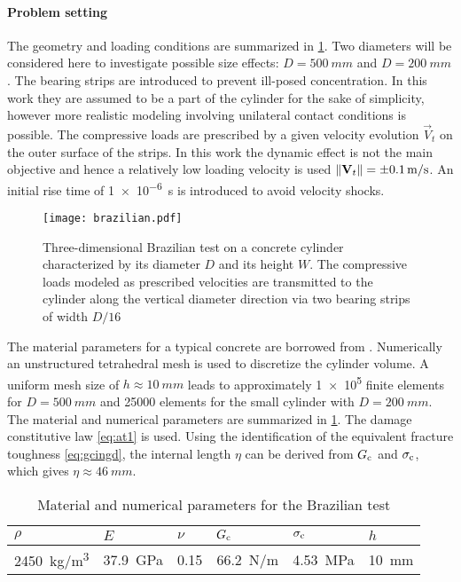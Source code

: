 \paragraph{Problem setting} The geometry and loading conditions are summarized in \cref{fig:brazilian}. Two diameters will be considered here to investigate possible size effects: $D=\SI{500}{mm}$ and $D=\SI{200}{mm}$. The bearing strips are introduced to prevent ill-posed concentration. In this work they are assumed to be a part of the cylinder for the sake of simplicity, however more realistic modeling involving unilateral contact conditions is possible. The compressive loads are prescribed by a given velocity evolution $\vec{V}_t$ on the outer surface of the strips. In this work the dynamic effect is not the main objective and hence a relatively low loading velocity is used $\norm{\vec{V}_t}=\SI{\pm 0.1}{m/s}$. An initial rise time of \SI{1e-6}{s} is introduced to avoid velocity shocks.
\begin{figure}[htbp]
\centering
\texttt{[image: brazilian.pdf]}
\caption{Three-dimensional Brazilian test on a concrete cylinder characterized by its diameter $D$ and its height $W$. The compressive loads modeled as prescribed velocities are transmitted to the cylinder along the vertical diameter direction via two bearing strips of width $D/16$} \label{fig:brazilian}
\end{figure}
The material parameters for a typical concrete are borrowed from \cite{RuizOrtizPandolfi:2000}. Numerically an unstructured tetrahedral mesh is used to discretize the cylinder volume. A uniform mesh size of $h\approx\SI{10}{mm}$ leads to approximately \num{1e5} finite elements for $D=\SI{500}{mm}$ and \num{25000} elements for the small cylinder with $D=\SI{200}{mm}$. The material and numerical parameters are summarized in \cref{tab:brazilian}. The damage constitutive law \eqref{eq:at1} is used. Using the identification of the equivalent fracture toughness \eqref{eq:gcingd}, the internal length $\eta$ can be derived from $G_\mathrm{c}$ and $\sigma_{\mathrm{c}}$, which gives $\eta\approx \SI{46}{mm}$.
\begin{table}[htbp]
\centering
\caption{Material and numerical parameters for the Brazilian test} \label{tab:brazilian}
\begin{tabular}{llllll} \toprule
$\rho$ & $E$ & $\nu$ & $G_\mathrm{c}$ & $\sigma_{\mathrm{c}}$ & $h$ \\ \midrule
\SI{2450}{kg/m^3} & \SI{37.9}{GPa} & 0.15 & \SI{66.2}{N/m} & \SI{4.53}{MPa} & \SI{10}{mm} \\ \bottomrule
\end{tabular}
\end{table}

